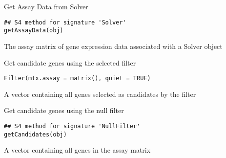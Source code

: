\documentclass[a4paper]{book}
\begin{document}
%
\begin{Description}\relax
Get Assay Data from Solver
\end{Description}
%
\begin{Usage}
\begin{verbatim}
## S4 method for signature 'Solver'
getAssayData(obj)
\end{verbatim}
\end{Usage}
%
\begin{Value}
The assay matrix of gene expression data associated with a Solver object
\end{Value}
%
\begin{Description}\relax
Get candidate genes using the selected filter
\end{Description}
%
\begin{Usage}
\begin{verbatim}
Filter(mtx.assay = matrix(), quiet = TRUE)
\end{verbatim}
\end{Usage}
%
\begin{Value}
A vector containing all genes selected as candidates by the filter
\end{Value}
%
\begin{Description}\relax
Get candidate genes using the null filter
\end{Description}
%
\begin{Usage}
\begin{verbatim}
## S4 method for signature 'NullFilter'
getCandidates(obj)
\end{verbatim}
\end{Usage}
%
\begin{Value}
A vector containing all genes in the assay matrix
\end{Value}
\end{document}
